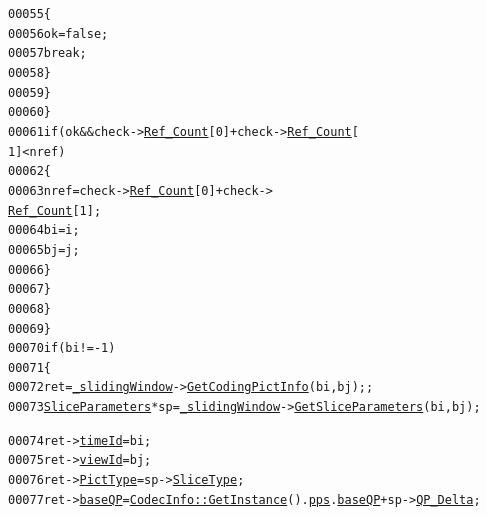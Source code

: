 \begin{footnotesize}
\begin{alltt}
00055                                                 \{
00056                                                         ok = \textcolor{keyword}{false};
00057                                                         \textcolor{keywordflow}{break};
00058                                                 \}
00059                                         \}
00060                                 \}
00061                                 \textcolor{keywordflow}{if} (ok && check->\hyperlink{struct_coding_pict_info_ab48541faa825385baeca833ffe98b3d4}{Ref_Count}[0] + check->\hyperlink{struct_coding_pict_info_ab48541faa825385baeca833ffe98b3d4}{Ref_Count}[
      1] < nref)
00062                                 \{
00063                                         nref = check->\hyperlink{struct_coding_pict_info_ab48541faa825385baeca833ffe98b3d4}{Ref_Count}[0] + check->
      \hyperlink{struct_coding_pict_info_ab48541faa825385baeca833ffe98b3d4}{Ref_Count}[1];
00064                                         bi = i;
00065                                         bj = j;
00066                                 \}
00067                         \}
00068                 \}
00069         \}
00070         \textcolor{keywordflow}{if} (bi!=-1)
00071         \{
00072                 ret = \hyperlink{class_a_frame_controller_aca7790494d5c5d114171269ddaabd568}{_slidingWindow}->\hyperlink{class_sliding_window_ac50874323a2aaa4ef76fab47f80c9f92}{GetCodingPictInfo}(bi, bj);;
00073                 \hyperlink{struct_slice_parameters}{SliceParameters} *sp = \hyperlink{class_a_frame_controller_aca7790494d5c5d114171269ddaabd568}{_slidingWindow}->\hyperlink{class_sliding_window_a020d2c25f1bda31337f91bf9b1a809d1}{GetSliceParameters}(bi, bj);
      
00074                 ret->\hyperlink{struct_coding_pict_info_ad85dae4751165ea3cbb8f7b8c6e61dc3}{timeId} = bi;
00075                 ret->\hyperlink{struct_coding_pict_info_a987595091bfba91b3166b04bca988697}{viewId} = bj;
00076                 ret->\hyperlink{struct_coding_pict_info_a6bfb22b57d0d223546150c71e125fb39}{PictType} = sp->\hyperlink{struct_slice_parameters_a8ab83c948c5e095477d918c0664fce0a}{SliceType};
00077                 ret->\hyperlink{struct_coding_pict_info_a6e808cdf552c3a18da4b75f4d0c35c28}{baseQP} = \hyperlink{class_codec_info_ad439fd8062a03d868dfe9c9b615b747e}{CodecInfo::GetInstance}().\hyperlink{class_codec_info_abaa8d84a7d4045129ee64d91eaac4481}{pps}.\hyperlink{struct_picture_parameters_set_a1c6a508d31929ad84dec0b717ac484a4}{baseQP} + sp->\hyperlink{struct_slice_parameters_a5ca0d343251519b63746af21c1cb9f70}{QP_Delta};
      

\end{alltt}
\end{footnotesize}
